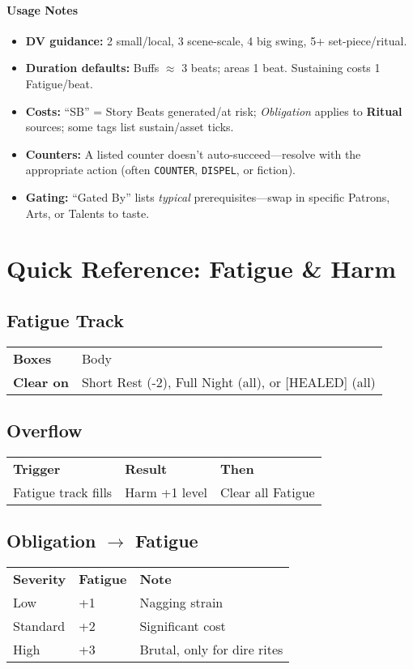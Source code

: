 \paragraph{Usage Notes}
\begin{itemize}
  \item \textbf{DV guidance:} 2 small/local, 3 scene-scale, 4 big swing, 5+ set-piece/ritual.
  \item \textbf{Duration defaults:} Buffs $\approx$ 3 beats; areas 1 beat. Sustaining costs 1 Fatigue/beat.
  \item \textbf{Costs:} “SB” = Story Beats generated/at risk; \emph{Obligation} applies to \textbf{Ritual} sources; some tags list sustain/asset ticks.
  \item \textbf{Counters:} A listed counter doesn’t auto-succeed—resolve with the appropriate action (often \texttt{COUNTER}, \texttt{DISPEL}, or fiction).
  \item \textbf{Gating:} “Gated By” lists \emph{typical} prerequisites—swap in specific Patrons, Arts, or Talents to taste.
\end{itemize}

\section{Quick Reference: Fatigue \& Harm}
\label{sec:quick-ref-fatigue-harm}

\subsection*{Fatigue Track}
\begin{tabular}{@{}ll@{}}
\textbf{Boxes} & Body \\
\textbf{Clear on} & Short Rest (-2), Full Night (all), or [HEALED] (all) \\
\end{tabular}

\subsection*{Overflow}
\begin{tabular}{@{}lll@{}}
\textbf{Trigger} & \textbf{Result} & \textbf{Then} \\
Fatigue track fills & Harm +1 level & Clear all Fatigue \\
\end{tabular}

\subsection*{Obligation $\rightarrow$ Fatigue}
\begin{tabular}{@{}lll@{}}
\textbf{Severity} & \textbf{Fatigue} & \textbf{Note} \\
Low & +1 & Nagging strain \\
Standard & +2 & Significant cost \\
High & +3 & Brutal, only for dire rites \\
\end{tabular}

